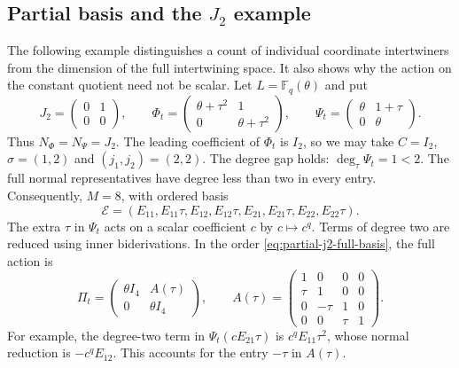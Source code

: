 \subsection{Partial basis and the \texorpdfstring{$J_2$}{J2} example}
\label{sec:partial-basis-j2}

The following example distinguishes a count of individual coordinate
intertwiners from the dimension of the full intertwining space. It also
shows why the action on the constant quotient need not be scalar.
Let $L=\mathbb F_q(\theta)$ and put
\[
 J_2=\begin{pmatrix}0&1\\0&0\end{pmatrix},\qquad
 \Phi_t=\begin{pmatrix}\theta+\tau^2&1\\0&\theta+\tau^2\end{pmatrix},
 \qquad
 \Psi_t=\begin{pmatrix}\theta&1+\tau\\0&\theta\end{pmatrix}.
\]
Thus $N_\Phi=N_\Psi=J_2$. The leading coefficient of $\Phi_t$ is
$I_2$, so we may take $C=I_2$, $\sigma=(1,2)$ and
$(j_1,j_2)=(2,2)$. The degree gap holds:
$\deg_\tau\Psi_t=1<2$.
The full normal representatives have degree less than two in every entry.
Consequently, $M=8$, with ordered basis
\begin{equation}
 \mathcal E=(E_{11},E_{11}\tau,E_{12},E_{12}\tau,
             E_{21},E_{21}\tau,E_{22},E_{22}\tau).
 \label{eq:partial-j2-full-basis}
\end{equation}
The extra $\tau$ in $\Psi_t$ acts on a scalar coefficient $c$
by $c\mapsto c^q$. Terms of degree two are reduced using inner
biderivations. In the order \eqref{eq:partial-j2-full-basis}, the full action is
\begin{equation}
 \Pi_t=\begin{pmatrix}\theta I_4&A(\tau)\\0&\theta I_4\end{pmatrix},
 \qquad
 A(\tau)=\begin{pmatrix}
  1&0&0&0\\
  \tau&1&0&0\\
  0&-\tau&1&0\\
  0&0&\tau&1
 \end{pmatrix}.
 \label{eq:partial-j2-full-action}
\end{equation}
For example, the degree-two term in $\Psi_t(cE_{21}\tau)$
is $c^qE_{11}\tau^2$, whose normal reduction is $-c^qE_{12}$.
This accounts for the entry $-\tau$ in $A(\tau)$.

